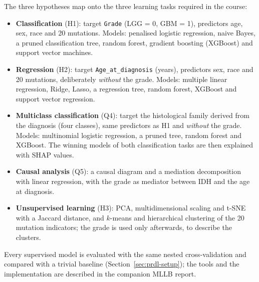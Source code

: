 The three hypotheses map onto the three learning tasks required in the course:
\begin{itemize}
  \item \textbf{Classification} (H1): target \texttt{Grade} (LGG = 0, GBM = 1), predictors age,
        sex, race and 20 mutations. Models: penalised logistic regression, naive Bayes, a pruned
        classification tree, random forest, gradient boosting (XGBoost) and support vector machines.
  \item \textbf{Regression} (H2): target \texttt{Age\_\allowbreak{}at\_\allowbreak{}diagnosis} (years), predictors sex, race
        and 20 mutations, deliberately \emph{without} the grade. Models: multiple linear regression,
        Ridge, Lasso, a regression tree, random forest, XGBoost and support vector regression.
  \item \textbf{Multiclass classification} (Q4): target the histological family derived from the
        diagnosis (four classes), same predictors as H1 and \emph{without} the grade. Models:
        multinomial logistic regression, a pruned tree, random forest and XGBoost. The winning models of
        both classification tasks are then explained with SHAP values.
  \item \textbf{Causal analysis} (Q5): a causal diagram and a mediation decomposition with linear
        regression, with the grade as mediator between IDH and the age at diagnosis.
  \item \textbf{Unsupervised learning} (H3): PCA, multidimensional scaling and t-SNE with a
        Jaccard distance, and $k$-means and hierarchical clustering of the 20 mutation indicators;
        the grade is used only afterwards, to describe the clusters.
\end{itemize}
Every supervised model is evaluated with the same nested cross-validation and compared with a
trivial baseline (Section~\ref{sec:prdl-setup}); the tools and the implementation are described
in the companion MLLB report.
